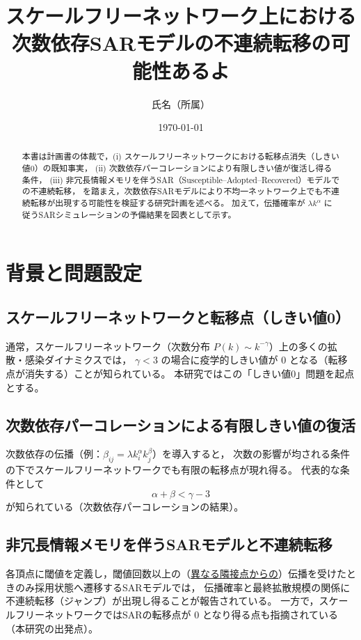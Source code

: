 \documentclass[uplatex,dvipdfmx,11pt]{bxjsarticle}
\title{スケールフリーネットワーク上における次数依存SARモデルの不連続転移の可能性あるよ}
\author{氏名（所属）}
\date{\today}
\begin{document}
\maketitle

\begin{abstract}
本書は計画書の体裁で，(i) スケールフリーネットワークにおける転移点消失（しきい値0）の既知事実，
(ii) 次数依存パーコレーションにより有限しきい値が復活し得る条件，
(iii) 非冗長情報メモリを伴うSAR（Susceptible--Adopted--Recovered）モデルでの不連続転移，
を踏まえ，次数依存SARモデルにより不均一ネットワーク上でも不連続転移が出現する可能性を検証する研究計画を述べる。
加えて，伝播確率が $\lambda k^\alpha$ に従うSARシミュレーションの予備結果を図表として示す。
\end{abstract}

\section{背景と問題設定}
\subsection{スケールフリーネットワークと転移点（しきい値0）}
通常，スケールフリーネットワーク（次数分布 $P(k)\sim k^{-\gamma}$）上の多くの拡散・感染ダイナミクスでは，
$\gamma<3$ の場合に疫学的しきい値が 0 となる（転移点が消失する）ことが知られている。
本研究ではこの「しきい値0」問題を起点とする。

\subsection{次数依存パーコレーションによる有限しきい値の復活}
次数依存の伝播（例：$\beta_{ij}=\lambda k_i^{\alpha}k_j^{\beta}$）を導入すると，
次数の影響が均される条件の下でスケールフリーネットワークでも有限の転移点が現れ得る。
代表的な条件として
\begin{equation}
\alpha+\beta < \gamma - 3
\label{eq:alpha_beta_condition}
\end{equation}
が知られている（次数依存パーコレーションの結果）\cite{BaxterTimar2021}。

\subsection{非冗長情報メモリを伴うSARモデルと不連続転移}
各頂点に閾値を定義し，閾値回数以上の（\underline{異なる隣接点からの}）伝播を受けたときのみ採用状態へ遷移するSARモデルでは，
伝播確率と最終拡散規模の関係に不連続転移（ジャンプ）が出現し得ることが報告されている\cite{WangEtAl2015}。
一方で，スケールフリーネットワークではSARの転移点が 0 となり得る点も指摘されている（本研究の出発点）。
\end{document}
